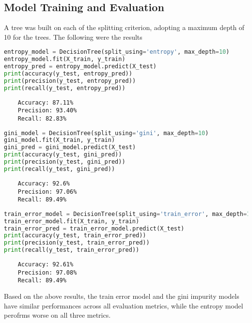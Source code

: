 \documentclass{article}
\begin{document}
\subsection{Model Training and Evaluation}

A tree was built on each of the splitting criterion, adopting a maximum depth of 10 for the trees. 
The following were the results

\begin{lstlisting}[language=Python, caption=Entropy Tree]
entropy_model = DecisionTree(split_using='entropy', max_depth=10)
entropy_model.fit(X_train, y_train)
entropy_pred = entropy_model.predict(X_test)
print(accuracy(y_test, entropy_pred))
print(precision(y_test, entropy_pred))
print(recall(y_test, entropy_pred))
\end{lstlisting}

\begin{lstlisting}
    Accuracy: 87.11%
    Precision: 93.40%
    Recall: 82.83%
\end{lstlisting}

\begin{lstlisting}[language=Python, caption=Gini Tree]
gini_model = DecisionTree(split_using='gini', max_depth=10)
gini_model.fit(X_train, y_train)
gini_pred = gini_model.predict(X_test)
print(accuracy(y_test, gini_pred))
print(precision(y_test, gini_pred))
print(recall(y_test, gini_pred))
\end{lstlisting}

\begin{lstlisting}
    Accuracy: 92.6%
    Precision: 97.06%
    Recall: 89.49%
\end{lstlisting}

\begin{lstlisting}[language=Python, caption=Train error Tree]
train_error_model = DecisionTree(split_using='train_error', max_depth=10)
train_error_model.fit(X_train, y_train)
train_error_pred = train_error_model.predict(X_test)
print(accuracy(y_test, train_error_pred))
print(precision(y_test, train_error_pred))
print(recall(y_test, train_error_pred))
\end{lstlisting}

\begin{lstlisting}
    Accuracy: 92.61%
    Precision: 97.08%
    Recall: 89.49%
\end{lstlisting}

Based on the above results, the train error model and the gini impurity models have similar performances across all evaluation metrics, while the entropy model perofrms worse on all three metrics.
\end{document}
